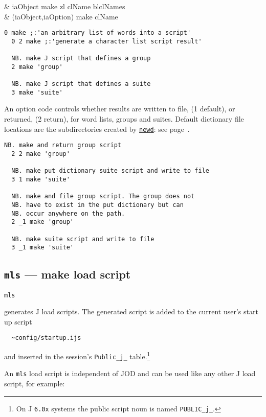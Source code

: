 \begin{wordhead}
\dyad & iaObject make zl \argsep clName \argsep blclNames \\
      & (iaObject,iaOption) make clName \\
\end{wordhead}
\begin{lstlisting}[frame=single,framerule=0pt] 
  0 make ;:'an arbitrary list of words into a script'
  0 2 make ;:'generate a character list script result' 

  NB. make J script that defines a group
  2 make 'group' 
  
  NB. make J script that defines a suite 
  3 make 'suite' 
\end{lstlisting}

An option code controls whether 
results are written to file, (1 default),
or returned, (2 return), for word lists, groups and suites.
Default dictionary file locations are the 
subdirectories created by \hyperlink{il:newd}{\texttt{newd}}: see page~\pageref{ss:newd}.

\begin{lstlisting}[frame=single,framerule=0pt] 
  NB. make and return group script
  2 2 make 'group'  
  
  NB. make put dictionary suite script and write to file 
  3 1 make 'suite'  

  NB. make and file group script. The group does not
  NB. have to exist in the put dictionary but can
  NB. occur anywhere on the path. 
  2 _1 make 'group'

  NB. make suite script and write to file 
  3 _1 make 'suite' 
\end{lstlisting}


\subsection{\texttt{mls} --- make load script}\label{ss:mls} 

\hypertarget{il:mls}{\texttt{mls}} generates J 
load scripts.  
The generated script is added 
to the current user's start up script
\begin{verbatim}
  ~config/startup.ijs
\end{verbatim}
and inserted in the session's \verb|Public_j_| table.\footnote{On J 
\texttt{6.0x} systems the public script noun is named \texttt{PUBLIC\_j\_}.}

An \verb|mls| load script is independent of JOD and can be used 
like any other J load script, for example:

